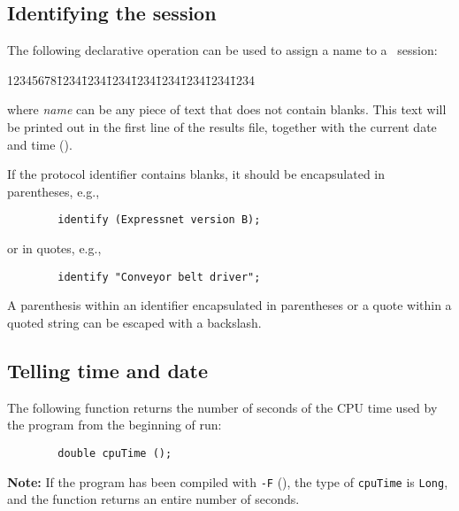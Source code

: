 \subsection{Identifying the session}
\label{rm_au_id}

The following declarative operation can be used to assign a name to
a \smurph\ session:
{\tt\begin{tabbing}
12345678\=1234\=1234\=1234\=1234\=1234\=1234\=1234\=1234\kill
{}
\end{tabbing}}
\noindent
where {\em name\/} can be any piece of text that does not contain blanks.
This text will be printed out in the first line of the results
file, together with the current date and time ().

If the protocol identifier contains blanks, it should be encapsulated in
parentheses, e.g.,
\begin{verbatim}
        identify (Expressnet version B);
\end{verbatim}
or in quotes, e.g.,
\begin{verbatim}
        identify "Conveyor belt driver";
\end{verbatim}

A parenthesis within an identifier encapsulated in parentheses
or a quote within a
quoted string can be escaped with a backslash.

\subsection{Telling time and date}
\label{rm_au_td}

The following function returns the number of seconds of the CPU time used
by the program from the beginning of run:
\begin{verbatim}
        double cpuTime ();
\end{verbatim}

\medskip

\noindent
{\bf Note:}
If the program has been compiled with {\tt -F} (),
the type of {\tt cpuTime} is {\tt Long}, and the function returns
an entire number of seconds.

\medskip


